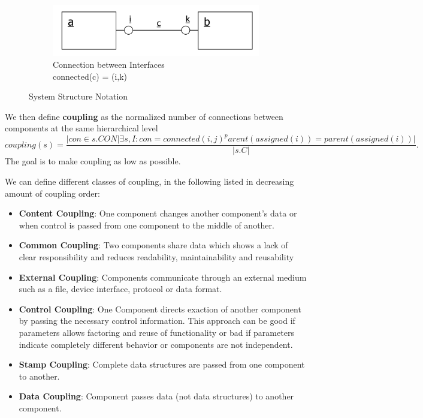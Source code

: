 \begin{figure}[h]
  \begin{subfigure}{.3\textwidth}
    \centering
    \includegraphics[width=\textwidth]{images/component_connection.png}
    \caption{Connection between Interfaces\\ connected(c) = (i,k)}
  \end{subfigure}
  \caption{System Structure Notation}\label{fig:system_structure_notation}
\end{figure}

We then define \textbf{coupling} as the normalized number of connections between components at the same hierarchical level 
\begin{equation*}
  coupling(s) = \frac{{|con \in s.CON| \exists s,I: con = connected(i,j) ^ parent(assigned(i)) = parent(assigned(i))}|}{|s.C|}.
\end{equation*}
The goal is to make coupling as low as possible.

We can define different classes of coupling, in the following listed in decreasing amount of coupling order:
\begin{itemize}
  \item \textbf{Content Coupling}: One component changes another component's data or when control is passed from one component to the middle of another.
  \item \textbf{Common Coupling}: Two components share data which shows a lack of clear responsibility and reduces readability, maintainability and reusability
  \item \textbf{External Coupling}: Components communicate through an external medium such as a file, device interface, protocol or data format.
  \item \textbf{Control Coupling}: One Component directs exaction of another component by passing the necessary control information. This approach can be good if parameters allows factoring and reuse of functionality or bad if parameters indicate completely different behavior or components are not independent.
  \item \textbf{Stamp Coupling}: Complete data structures are passed from one component to another.
  \item \textbf{Data Coupling}: Component passes data (not data structures) to another component.
\end{itemize}

